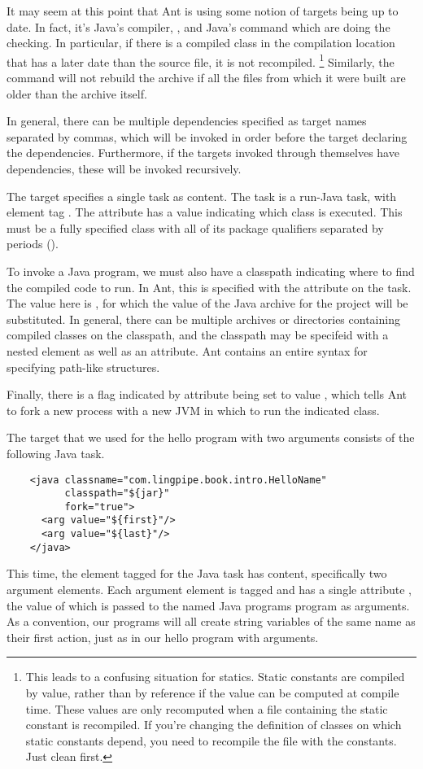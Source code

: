 It may seem at this point that Ant is using some notion of targets
being up to date.  In fact, it's Java's compiler, , and
Java's  command which are doing the checking.  In
particular, if there is a compiled class in the compilation location
that has a later date than the source file, it is not recompiled.%
%
\footnote{This leads to a confusing situation for statics.  Static
constants are compiled by value, rather than by reference if the value
can be computed at compile time.  These values are only recomputed
when a file containing the static constant is recompiled.  If you're
changing the definition of classes on which static constants depend,
you need to recompile the file with the constants.  Just clean first.}
%
Similarly, the  command will not rebuild the archive if
all the files from which it were built are older than the archive
itself.

In general, there can be multiple dependencies specified as target
names separated by commas, which will be invoked in order before the
target declaring the dependencies.  Furthermore, if the targets
invoked through  themselves have dependencies, these
will be invoked recursively.

The  target specifies a single task as content.  The task
is a run-Java task, with element tag .  The attribute
 has a value indicating which class is executed.  This
must be a fully specified class with all of its package qualifiers
separated by periods ().  

To invoke a Java program, we must also have a classpath indicating where
to find the compiled code to run.  In Ant, this is specified with
the  attribute on the  task.  The value here
is , for which the value of the Java archive for the
project will be substituted.  In general, there can be multiple archives
or directories containing compiled classes on the classpath, and the
classpath may be specifeid with a nested element as well as an attribute.
Ant contains an entire syntax for specifying path-like structures.

Finally, there is a flag indicated by attribute  being
set to value , which tells Ant to fork a new process with
a new JVM in which to run the indicated class.  

The target  that we used for the hello program with
two arguments consists of the following Java task.
%
\begin{verbatim}
    <java classname="com.lingpipe.book.intro.HelloName"
          classpath="${jar}"
          fork="true">
      <arg value="${first}"/>
      <arg value="${last}"/>
    </java>
\end{verbatim}
%
This time, the element tagged  for the Java task has
content, specifically two argument elements.  Each argument element is
tagged  and has a single attribute , the value
of which is passed to the named Java programs  program as
arguments.  As a convention, our programs will all create string
variables of the same name as their first action, just as in our
hello program with arguments. 



